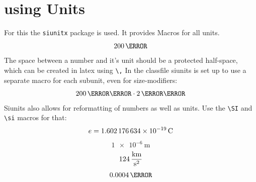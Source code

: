 \documentclass[	%
		fontsize=11pt,  %
		a4paper,	    %
		twoside,		%
		english,		%
		sans,			%
		f1,				%
	]{HsH-report}		%
\begin{document}
	\section{using Units}
		For this the \lstinline{siunitx} package is used. It provides Macros for all units.
		\begin{equation}
			200\,\kg
		\end{equation}
		The space between a number and it's unit should be a protected half-space, which can be created in latex using \lstinline{\,} In the classfile
		siunits is set up to use a separate macro for each subunit, even for size-modifiers:
		\begin{equation}
			200\,\milli\metre \cdot 2\,\mega\volt
		\end{equation}
		Siunits also allows for reformatting of numbers as well as units. Use the \lstinline{\SI} and \lstinline{\si} macros for that:
		\begin{equation}
			e = \SI{1.602176634E-19}{\coulomb} %
		\end{equation}
		\begin{equation}
			\SI[exponent-to-prefix]{1e-6}{\metre}%
		\end{equation}
		\begin{equation}
			124\,\si[per-mode=fraction]{\kilo\metre\per\second\squared} %
		\end{equation}
		\begin{equation}
			\num{0.0004}\,\lumen %
		\end{equation}
\end{document}
